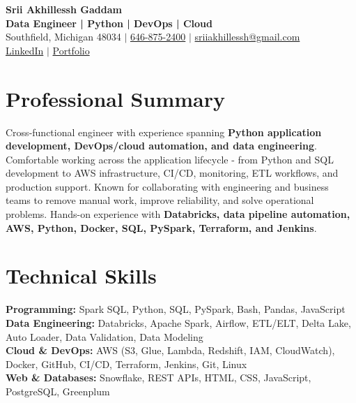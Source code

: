 \documentclass[letterpaper,10pt]{article}
\begin{document}
\fontsize{9.35pt}{10.45pt}\selectfont

\begin{center}
    {\LARGE \textbf{Srii Akhillessh Gaddam}} \\[-1pt]
    \textbf{Data Engineer | Python | DevOps | Cloud} \\[2pt]
    Southfield, Michigan 48034 $|$
    \href{tel:6468752400}{646-875-2400} $|$
    \href{mailto:sriiakhillessh@gmail.com}{sriiakhillessh@gmail.com} \\[1pt]
    \href{https://www.linkedin.com/in/srii-akhiilessh-gaddam-b48668191/}{LinkedIn} $|$
    \href{https://sriiakhillesshg.github.io/portfolio/}{Portfolio}
\end{center}
\vspace{-8pt}

\section{Professional Summary}
\small{Cross-functional engineer with experience spanning \textbf{Python application development, DevOps/cloud automation, and data engineering}. Comfortable working across the application lifecycle - from Python and SQL development to AWS infrastructure, CI/CD, monitoring, ETL workflows, and production support. Known for collaborating with engineering and business teams to remove manual work, improve reliability, and solve operational problems. Hands-on experience with \textbf{Databricks, data pipeline automation, AWS, Python, Docker, SQL, PySpark, Terraform, and Jenkins}.}

\section{Technical Skills}
\small{
\textbf{Programming:} Spark SQL, Python, SQL, PySpark, Bash, Pandas, JavaScript \\
\textbf{Data Engineering:} Databricks, Apache Spark, Airflow, ETL/ELT, Delta Lake, Auto Loader, Data Validation, Data Modeling \\
\textbf{Cloud \& DevOps:} AWS (S3, Glue, Lambda, Redshift, IAM, CloudWatch), Docker, GitHub, CI/CD, Terraform, Jenkins, Git, Linux \\
\textbf{Web \& Databases:} Snowflake, REST APIs, HTML, CSS, JavaScript, PostgreSQL, Greenplum
}

\end{document}
